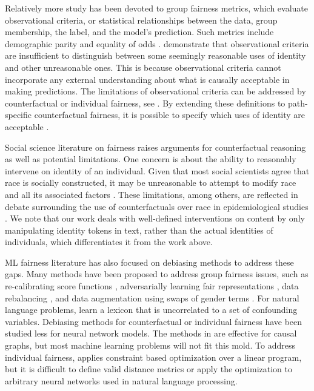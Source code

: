 \documentclass[letterpaper]{article} %
\theoremstyle{definition}
\begin{document}
Relatively more study has been devoted to group fairness metrics, which evaluate observational criteria, or statistical relationships between the data, group membership, the label, and the model's prediction. Such metrics include demographic parity and equality of odds \cite{Hardt16}. \citeauthor{Hardt16} demonstrate that observational criteria are insufficient to distinguish between some seemingly reasonable uses of identity and other unreasonable ones. This is because observational criteria cannot incorporate any external understanding about what is causally acceptable in making predictions. The limitations of observational criteria can be addressed by counterfactual or individual fairness, see \cite{Kusner17,Kilbertus17,Dwork11}. By extending these definitions to path-specific counterfactual fairness, it is possible to specify which uses of identity are acceptable \cite{Chiappa18}.

Social science literature on fairness raises arguments for counterfactual reasoning as well as potential limitations. One concern is about the ability to reasonably intervene on identity of an individual. Given that most social scientists agree that race is socially constructed, it may be unreasonable to attempt to modify race and all its associated factors \cite{KH19}. These limitations, among others, are reflected in debate surrounding the use of counterfactuals over race in epidemiological studies \cite{Krieger14,VWT14}. We note that our work deals with well-defined interventions on content by only manipulating identity tokens in text, rather than the actual identities of individuals, which differentiates it from the work above. 

ML fairness literature has also focused on debiasing methods to address these gaps. Many methods have been proposed to address group fairness issues, such as re-calibrating score functions \cite{Hardt16}, adversarially learning fair representations \cite{Zemel13,VFAE,Beutel17}, data rebalancing \cite{Dixon18}, and data augmentation using swaps of gender terms \cite{Park18}. For natural language problems, \citeauthor{Pryzant18} learn a lexicon that is uncorrelated to a set of confounding variables. Debiasing methods for counterfactual or individual fairness have been studied less for neural network models. The methods in \cite{Kusner17,Kilbertus17} are effective for causal graphs, but most machine learning problems will not fit this mold. To address individual fairness, \cite{Dwork11} applies constraint based optimization over a linear program, but it is difficult to define valid distance metrics or apply the optimization to arbitrary neural networks used in natural language processing. 
\end{document}
